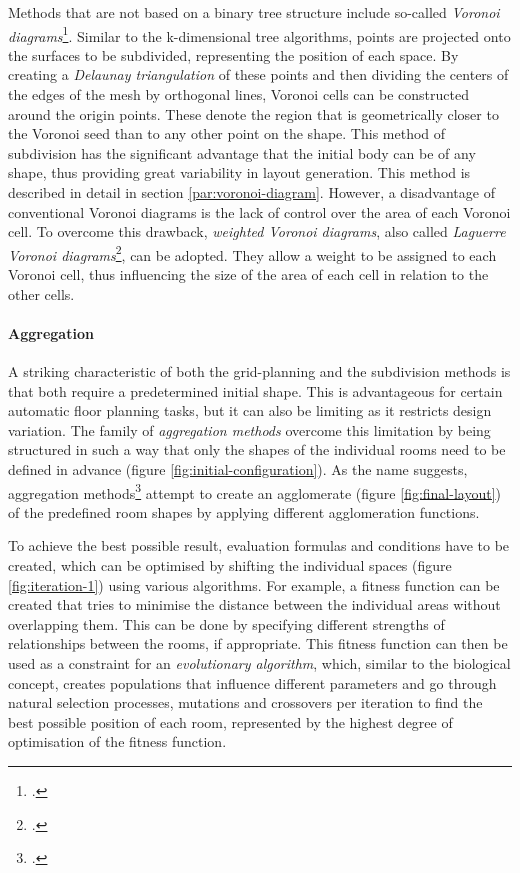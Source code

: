 \documentclass[a4paper, 12pt]{report}
\begin{document}
Methods that are not based on a \gls{binary tree} structure include so-called \textit{Voronoi diagrams}\footcite{coates2005generating}. Similar to the k-dimensional tree algorithms, points are projected onto the surfaces to be subdivided, representing the position of each space. By creating a \textit{Delaunay triangulation} of these points and then dividing the centers of the edges of the mesh by orthogonal lines, Voronoi cells can be constructed around the origin points. These denote the region that is geometrically closer to the Voronoi seed than to any other point on the shape. This method of subdivision has the significant advantage that the initial body can be of any shape, thus providing great variability in layout generation. This method is described in detail in section \ref{par:voronoi-diagram}. However, a disadvantage of conventional Voronoi diagrams is the lack of control over the area of each Voronoi cell. To overcome this drawback, \textit{weighted Voronoi diagrams}, also called \textit{Laguerre Voronoi diagrams}\footcite{anuradha2008voronoi}, can be adopted. They allow a weight to be assigned to each Voronoi cell, thus influencing the size of the area of each cell in relation to the other cells.

\paragraph{Aggregation}\label{par:aggregation}

A striking characteristic of both the grid-planning and the subdivision methods is that both require a predetermined initial shape. This is advantageous for certain automatic floor planning tasks, but it can also be limiting as it restricts design variation. The family of \textit{aggregation methods} overcome this limitation by being structured in such a way that only the shapes of the individual rooms need to be defined in advance (figure \ref{fig:initial-configuration}). As the name suggests, aggregation methods\footcite{as2021routledge} attempt to create an agglomerate (figure \ref{fig:final-layout}) of the predefined room shapes by applying different agglomeration functions.

To achieve the best possible result, evaluation formulas and conditions have to be created, which can be optimised by shifting the individual spaces (figure \ref{fig:iteration-1}) using various algorithms. For example, a \gls{fitness function} can be created that tries to minimise the distance between the individual areas without overlapping them. This can be done by specifying different strengths of relationships between the rooms, if appropriate. This \gls{fitness function} can then be used as a constraint for an \textit{evolutionary algorithm}, which, similar to the biological concept, creates populations that influence different parameters and go through natural selection processes, mutations and crossovers per iteration to find the best possible position of each room, represented by the highest degree of optimisation of the \gls{fitness function}.
\end{document}
